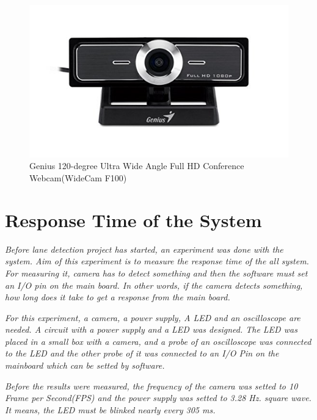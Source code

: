 \begin{figure}[H]
	\centering
	\hspace*{0cm}   
	\includegraphics[width=150mm,scale=1]{./Bilder/Genius_F100_camera.png}
	\caption{Genius 120-degree Ultra Wide Angle Full HD Conference Webcam(WideCam F100) }
\end{figure}









\section{Response Time of the System}\label{sec:Response Time of the System}

\emph{\color{blue}Before lane detection project has started, an experiment was done with the system. Aim of this experiment is to measure the response time of the all system. For measuring it, camera has to detect something and then the software must set an I/O pin on the main board. In other words, if the camera detects something, how long does it take to get a response from the main board.}

\emph{\color{blue}For this experiment, a camera, a power supply, A LED and an oscilloscope are needed. A circuit with a power supply and a LED was designed. The LED was placed in a small box with a camera, and a probe of an oscilloscope was connected to the LED and the other probe of it was connected to an I/O Pin on the mainboard which can be setted by software.}

\emph{\color{blue}Before the results were measured, the frequency of the camera was setted to 10 Frame per Second(FPS) and the power supply was setted to 3.28 Hz. square wave. It means, the LED must be blinked nearly every 305 ms.}

